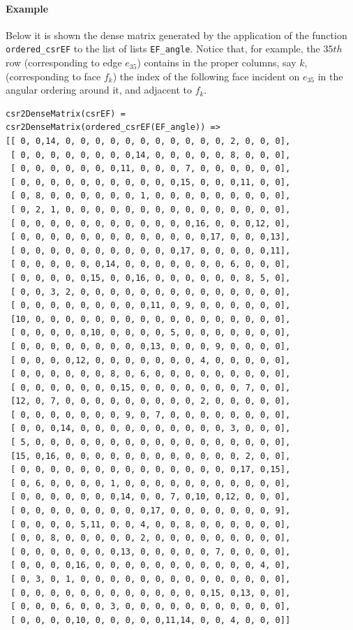\documentclass[11pt,oneside]{article}    %
\begin{document}
\paragraph{Example}
Below it is shown the dense matrix generated by the application of the function \texttt{ordered\_csrEF} to the list of lists \texttt{EF\_angle}. Notice that, for example, the $35th$ row (corresponding to edge $e_{35}$) contains in the proper columns, say $k$, (corresponding to face $f_{k}$) the index of the following face incident on $e_{35}$ in the angular ordering around it, and adjacent to $f_k$.

{\small
\begin{verbatim}
csr2DenseMatrix(csrEF) = 
csr2DenseMatrix(ordered_csrEF(EF_angle)) =>
[[ 0, 0,14, 0, 0, 0, 0, 0, 0, 0, 0, 0, 0, 0, 2, 0, 0, 0],
 [ 0, 0, 0, 0, 0, 0, 0, 0,14, 0, 0, 0, 0, 0, 8, 0, 0, 0],
 [ 0, 0, 0, 0, 0, 0, 0,11, 0, 0, 0, 7, 0, 0, 0, 0, 0, 0],
 [ 0, 0, 0, 0, 0, 0, 0, 0, 0, 0, 0,15, 0, 0, 0,11, 0, 0],
 [ 0, 8, 0, 0, 0, 0, 0, 0, 1, 0, 0, 0, 0, 0, 0, 0, 0, 0],
 [ 0, 2, 1, 0, 0, 0, 0, 0, 0, 0, 0, 0, 0, 0, 0, 0, 0, 0],
 [ 0, 0, 0, 0, 0, 0, 0, 0, 0, 0, 0, 0,16, 0, 0, 0,12, 0],
 [ 0, 0, 0, 0, 0, 0, 0, 0, 0, 0, 0, 0, 0,17, 0, 0, 0,13],
 [ 0, 0, 0, 0, 0, 0, 0, 0, 0, 0, 0,17, 0, 0, 0, 0, 0,11],
 [ 0, 0, 0, 0, 0, 0,14, 0, 0, 0, 0, 0, 0, 0, 6, 0, 0, 0],
 [ 0, 0, 0, 0, 0,15, 0, 0,16, 0, 0, 0, 0, 0, 0, 8, 5, 0],
 [ 0, 0, 3, 2, 0, 0, 0, 0, 0, 0, 0, 0, 0, 0, 0, 0, 0, 0],
 [ 0, 0, 0, 0, 0, 0, 0, 0, 0,11, 0, 9, 0, 0, 0, 0, 0, 0],
 [10, 0, 0, 0, 0, 0, 0, 0, 0, 0, 0, 0, 0, 0, 0, 0, 0, 0],
 [ 0, 0, 0, 0, 0,10, 0, 0, 0, 0, 5, 0, 0, 0, 0, 0, 0, 0],
 [ 0, 0, 0, 0, 0, 0, 0, 0, 0,13, 0, 0, 0, 9, 0, 0, 0, 0],
 [ 0, 0, 0, 0,12, 0, 0, 0, 0, 0, 0, 0, 4, 0, 0, 0, 0, 0],
 [ 0, 0, 0, 0, 0, 0, 8, 0, 6, 0, 0, 0, 0, 0, 0, 0, 0, 0],
 [ 0, 0, 0, 0, 0, 0, 0,15, 0, 0, 0, 0, 0, 0, 0, 7, 0, 0],
 [12, 0, 7, 0, 0, 0, 0, 0, 0, 0, 0, 0, 2, 0, 0, 0, 0, 0],
 [ 0, 0, 0, 0, 0, 0, 0, 9, 0, 7, 0, 0, 0, 0, 0, 0, 0, 0],
 [ 0, 0, 0,14, 0, 0, 0, 0, 0, 0, 0, 0, 0, 0, 3, 0, 0, 0],
 [ 5, 0, 0, 0, 0, 0, 0, 0, 0, 0, 0, 0, 0, 0, 0, 0, 0, 0],
 [15, 0,16, 0, 0, 0, 0, 0, 0, 0, 0, 0, 0, 0, 0, 2, 0, 0],
 [ 0, 0, 0, 0, 0, 0, 0, 0, 0, 0, 0, 0, 0, 0, 0,17, 0,15],
 [ 0, 6, 0, 0, 0, 0, 1, 0, 0, 0, 0, 0, 0, 0, 0, 0, 0, 0],
 [ 0, 0, 0, 0, 0, 0, 0,14, 0, 0, 7, 0,10, 0,12, 0, 0, 0],
 [ 0, 0, 0, 0, 0, 0, 0, 0, 0,17, 0, 0, 0, 0, 0, 0, 0, 9],
 [ 0, 0, 0, 0, 5,11, 0, 0, 4, 0, 0, 8, 0, 0, 0, 0, 0, 0],
 [ 0, 0, 8, 0, 0, 0, 0, 0, 2, 0, 0, 0, 0, 0, 0, 0, 0, 0],
 [ 0, 0, 0, 0, 0, 0, 0,13, 0, 0, 0, 0, 0, 7, 0, 0, 0, 0],
 [ 0, 0, 0, 0,16, 0, 0, 0, 0, 0, 0, 0, 0, 0, 0, 0, 4, 0],
 [ 0, 3, 0, 1, 0, 0, 0, 0, 0, 0, 0, 0, 0, 0, 0, 0, 0, 0],
 [ 0, 0, 0, 0, 0, 0, 0, 0, 0, 0, 0, 0, 0,15, 0,13, 0, 0],
 [ 0, 0, 0, 6, 0, 0, 3, 0, 0, 0, 0, 0, 0, 0, 0, 0, 0, 0],
 [ 0, 0, 0, 0,10, 0, 0, 0, 0, 0,11,14, 0, 0, 4, 0, 0, 0]]
\end{verbatim}}
\end{document}
